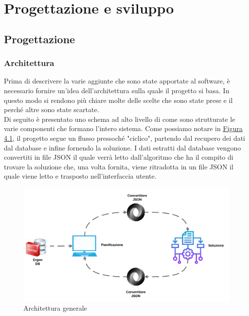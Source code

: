 
\chapter{Progettazione e sviluppo}
\label{cap:progettazione}

\section{Progettazione}
\subsection{Architettura}

Prima di descrivere la varie aggiunte che sono state apportate al software, è necessario fornire un'idea dell'architettura sulla quale il progetto si basa. In questo modo si 
rendono più chiare molte delle scelte che sono state prese e il perché altre sono state scartate.\\ Di seguito è presentato uno schema ad alto livello di come sono strutturate le
varie componenti che formano l'intero sistema. Come possiamo notare in \hyperref[4.1]{Figura 4.1}, il progetto segue un flusso pressoché "ciclico", partendo dal recupero dei dati dal
database e infine fornendo la soluzione. I dati estratti dal database vengono convertiti in file JSON il quale verrà letto dall'algoritmo che ha il compito di trovare la soluzione che,
una volta fornita, viene ritradotta in un file JSON il quale viene letto e trasposto nell'interfaccia utente.

\begin{figure}[H]
	\includegraphics[width=13cm]{immagini/architettura.png}
	\centering
    \caption{Architettura generale}
    \label{4.1}
\end{figure}

